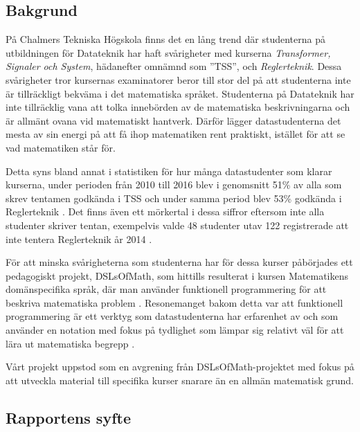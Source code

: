 \documentclass[]{article}
\begin{document}
\subsection{Bakgrund}

%

På Chalmers Tekniska Högskola finns det en lång trend där
studenterna på utbildningen för Datateknik har haft svårigheter
med kurserna \textit{Transformer, Signaler och System}, hädanefter omnämnd
som ''\gls{TSS}'', och \textit{Reglerteknik}.
Dessa svårigheter tror kursernas examinatorer beror till stor del på att
studenterna inte är tillräckligt bekväma i det matematiska språket.
Studenterna på Datateknik har inte tillräcklig vana att tolka innebörden av de matematiska beskrivningarna och är allmänt ovana vid matematiskt hantverk.
Därför lägger datastudenterna det mesta av sin energi på att få ihop matematiken
rent praktiskt, istället för att se vad matematiken står för.

Detta syns bland annat i statistiken för hur många datastudenter som
klarar kurserna, under perioden från 2010 till 2016 blev i genomsnitt 51\% av
alla som skrev tentamen godkända i TSS och under samma period blev 53\% godkända
i Reglerteknik \cite{tentastatistik}. Det finns även ett mörkertal i dessa siffror
eftersom inte alla studenter skriver tentan, exempelvis valde 48 studenter utav 122
registrerade att inte tentera Reglerteknik år 2014 \cite{kursinformation:ere102:14-15}.

För att minska svårigheterna som studenterna har för dessa kurser påbörjades
ett pedagogiskt projekt, DSLsOfMath, som hittills resulterat i kursen
Matematikens domänspecifika språk, där man använder funktionell
programmering för att beskriva matematiska problem \cite{kursplan:dslsofmath}.
Resonemanget bakom detta var att funktionell programmering är ett verktyg
som datastudenterna har erfarenhet av och som använder en notation med
fokus på tydlighet som lämpar sig relativt väl för att lära ut matematiska
begrepp \cite{TFPIE15_DSLsofMath_IonescuJansson}.

Vårt projekt uppstod som en avgrening från DSLsOfMath-projektet med fokus på att utveckla material till specifika kurser snarare än en allmän matematisk grund.

\subsection{Rapportens syfte}
\end{document}
